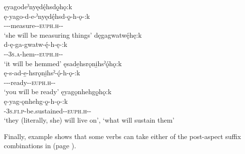 \ea\label{ex:statvarex10}
\ea ęyagodeˀnyędę́hsdǫ̱hǫ:k\\
\gll ę-yago-d-e-ˀnyędę́hsd-ǫ̱-h-ǫ-:k\\
 \fut--{\joinerE}-measure-{\stative}-\textsc{euph.h}-{\joiner}-{\modalizer}\\
\glt `she will be measuring things'
\ex dęgagwatwę́hę:k\\
\gll d-ę-ga-gwatw-ę́-h-ę-:k\\
 {\dualic}-{\future}-\textsc{3s.a}-hem-{\stative}-\textsc{euph.h}-{\joiner}-{\modalizer}\\
\glt `it will be hemmed'
\ex ęsade̱hsrǫni̱hsˀǫ́hǫ:k\\
\gll ę-s-ad-e̱-hsrǫni̱hsˀ-ǫ́-h-ǫ-:k\\
 \fut--{\joinerE}-ready-{\stative}-\textsc{euph.h}-{\joiner}-{\modalizer}\\
\glt `you will be ready'
\ex ęyagǫnhehgǫ̱hǫ:k \\
\gll ę-yag-ǫnhehg-ǫ̱-h-ǫ-:k\\
 \fut-\textsc{3s.fi.p}-be.sustained-{\stative}-\textsc{euph.h}-{\joiner}-{\modalizer}\\
\glt ‘they (literally, she) will live on’, `what will sustain them'
\z
\z

Finally, example  shows that some verbs can take either of the post-aspect suffix combinations in  (page \pageref{figtab:1:statvar2}).


